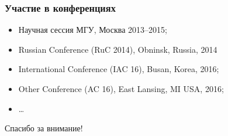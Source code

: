 \begin{frame}
    \frametitle{Участие в конференциях}
    \begin{itemize}[beginpenalty=10000, midpenalty=10000, wide=\parindent, leftmargin=0pt]
        \item Научная сессия МГУ, Москва 2013--2015;
        \item {} Russian Conference (RuC 2014), Obninsk, Russia, 2014
        \item {} International Conference (IAC 16), Busan, Korea,
              2016;
        \item {} Other Conference (AC 16), East Lansing, MI USA, 2016;
        \item \dots
    \end{itemize}
\end{frame}

\begin{frame} %
    \begin{center}
        \Huge
        Спасибо за внимание!
    \end{center}
\end{frame}
